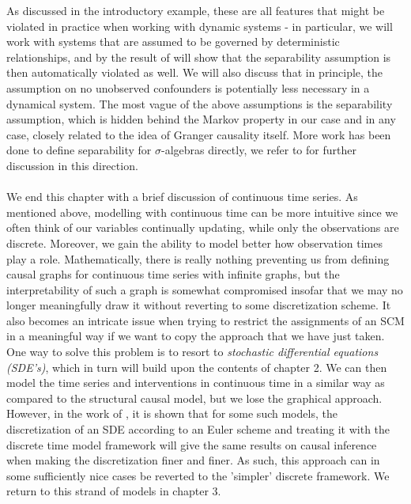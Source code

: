 \documentclass[11pt, a4paper]{memoir}
\theoremstyle{break}
\theoremstyle{break}
\theoremstyle{nonumberplain}
\begin{document}
As discussed in the introductory example, these are all features that might be violated in practice when working with dynamic systems - in particular, we will work with systems that are assumed to be governed by deterministic relationships, and by the result of \cite{Takens} will show that the separability assumption is then automatically violated as well. We will also discuss that in principle, the assumption on no unobserved confounders is potentially less necessary in a dynamical system. The most vague of the above assumptions is the separability assumption, which is hidden behind the Markov property in our case and in any case, closely related to the idea of Granger causality itself. More work has been done to define separability for $\sigma$-algebras directly, we refer to \cite{Sepa} for further discussion in this direction.\\\\
We end this chapter with a brief discussion of continuous time series. As mentioned above, modelling with continuous time can be more intuitive since we often think of our variables continually updating, while only the observations are discrete. Moreover, we gain the ability to model better how observation times play a role. Mathematically, there is really nothing preventing us from defining causal graphs for continuous time series with infinite graphs, but the interpretability of such a graph is somewhat compromised insofar that we may no longer meaningfully draw it without reverting to some discretization scheme. It also becomes an intricate issue when trying to restrict the assignments of an SCM in a meaningful way if we want to copy the approach that we have just taken. One way to solve this problem is to resort to \emph{stochastic differential equations (SDE's)}, which in turn will build upon the contents of chapter 2. We can then model the time series and interventions in continuous time in a similar way as compared to the structural causal model, but we lose the graphical approach. However, in the work of \cite{sokol2014}, it is shown that for some such models, the discretization of an SDE according to an Euler scheme and treating it with the discrete time model framework will give the same results on causal inference when making the discretization finer and finer. As such, this approach can in some sufficiently nice cases be reverted to the 'simpler' discrete framework. We return to this strand of models in chapter 3.
\end{document}
